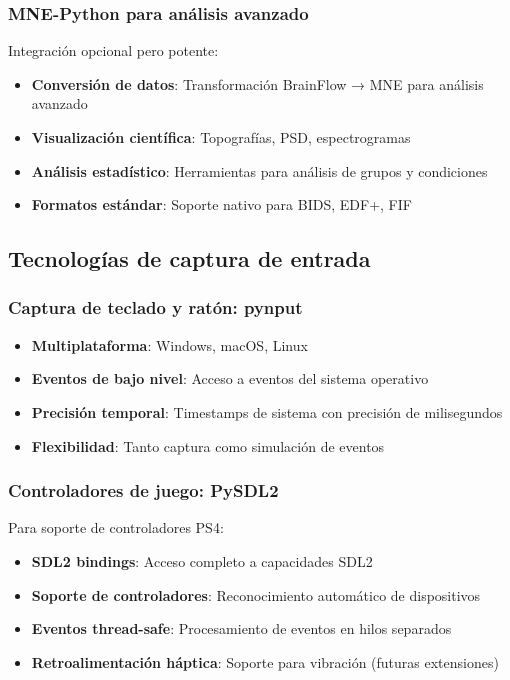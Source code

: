 \subsubsection{MNE-Python para análisis avanzado}
Integración opcional pero potente:

\begin{itemize}
    \item \textbf{Conversión de datos}: Transformación BrainFlow → MNE para análisis avanzado
    \item \textbf{Visualización científica}: Topografías, PSD, espectrogramas
    \item \textbf{Análisis estadístico}: Herramientas para análisis de grupos y condiciones
    \item \textbf{Formatos estándar}: Soporte nativo para BIDS, EDF+, FIF
\end{itemize}

\subsection{Tecnologías de captura de entrada}
\label{subsec:tecnologias_captura}

\subsubsection{Captura de teclado y ratón: pynput}
\begin{itemize}
    \item \textbf{Multiplataforma}: Windows, macOS, Linux
    \item \textbf{Eventos de bajo nivel}: Acceso a eventos del sistema operativo
    \item \textbf{Precisión temporal}: Timestamps de sistema con precisión de milisegundos
    \item \textbf{Flexibilidad}: Tanto captura como simulación de eventos
\end{itemize}

\subsubsection{Controladores de juego: PySDL2}
Para soporte de controladores PS4:

\begin{itemize}
    \item \textbf{SDL2 bindings}: Acceso completo a capacidades SDL2
    \item \textbf{Soporte de controladores}: Reconocimiento automático de dispositivos
    \item \textbf{Eventos thread-safe}: Procesamiento de eventos en hilos separados
    \item \textbf{Retroalimentación háptica}: Soporte para vibración (futuras extensiones)
\end{itemize}

